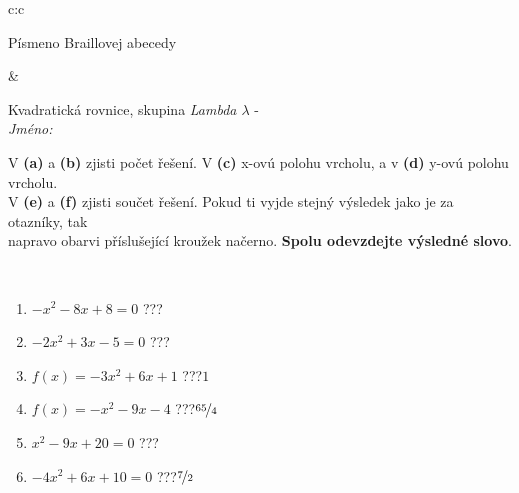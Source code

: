 \documentclass[10pt]{report}
\begin{document}
\begin{tabular}{c:c}
\begin{minipage}[c][104.5mm][t]{0.5\linewidth}
\begin{center}
\begin{minipage}{0.20\linewidth}
\begin{center}
{\small Písmeno Braillovej abecedy}
\end{center}
\end{minipage}
\end{center}
\end{minipage}
&
\begin{minipage}[c][104.5mm][t]{0.5\linewidth}
\begin{center}
\vspace{7mm}
{\huge Kvadratická rovnice, skupina \textit{Lambda $\lambda$} -}\\[5mm]
\textit{Jméno:}\phantom{xxxxxxxxxxxxxxxxxxxxxxxxxxxxxxxxxxxxxxxxxxxxxxxxxxxxxxxxxxxxxxxxx}\\[5mm]
\begin{minipage}{0.95\linewidth}
\begin{center}
V \textbf{(a)} a \textbf{(b)} zjisti počet řešení. V \textbf{(c)} x-ovú polohu vrcholu, a v \textbf{(d)} y-ovú polohu vrcholu.\\V \textbf{(e)} a \textbf{(f)} zjisti součet řešení. Pokud ti vyjde stejný výsledek jako je za otazníky, tak\\napravo obarvi příslušející kroužek načerno. \textbf{Spolu odevzdejte výsledné slovo}.
\end{center}
\end{minipage}
\\[1mm]
\begin{minipage}{0.79\linewidth}
\begin{center}
\begin{varwidth}{\linewidth}
\begin{enumerate}
\Large
\item $-x^2-8x+8=0$\quad \dotfill\; ???\;\dotfill {}
\item $-2x^2+3x-5=0$\quad \dotfill\; ???\;\dotfill {}
\item $f(x)=-3x^2+6x+1$\quad \dotfill\; ???\;\dotfill \quad $1$
\item $f(x)=-x^2-9x-4$\quad \dotfill\; ???\;\dotfill \quad $\nicefrac{65}{4}$
\item $x^2-9x+20=0$\quad \dotfill\; ???\;\dotfill {}
\item $-4x^2+6x+10=0$\quad \dotfill\; ???\;\dotfill \quad $\nicefrac{7}{2}$
\end{enumerate}
\end{varwidth}
\end{center}
\end{minipage}
\begin{minipage}{0.20\linewidth}
\begin{center}

\end{center}
\end{minipage}
\end{center}
\end{minipage}
\end{tabular}
\end{document}
